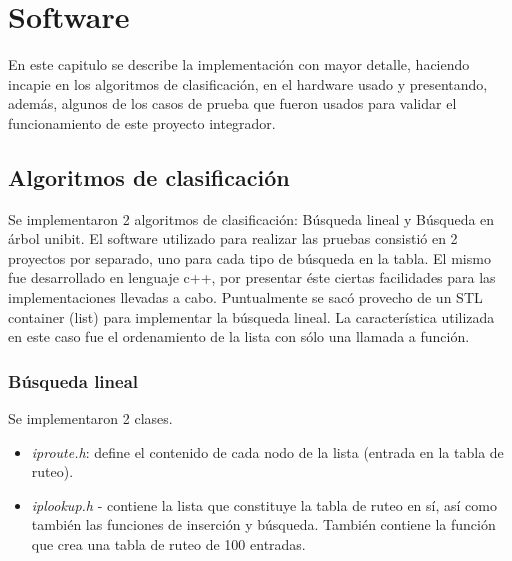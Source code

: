 \chapter{Software}

En este capitulo se describe la implementación con mayor detalle, haciendo incapie en los algoritmos de clasificación, en el hardware usado y presentando, además, algunos de los casos de prueba que fueron usados para validar el funcionamiento de este proyecto integrador.


\section{Algoritmos de clasificación}


Se implementaron 2 algoritmos de clasificación: Búsqueda lineal y Búsqueda en árbol unibit. El software utilizado para realizar las pruebas consistió en 2 proyectos por separado, uno para cada tipo de búsqueda en la tabla. El mismo fue desarrollado en lenguaje c++, por presentar éste ciertas facilidades para las implementaciones llevadas a cabo. Puntualmente se sacó provecho de un STL container (list) para implementar la búsqueda lineal. La característica utilizada en este caso fue el ordenamiento de la lista con sólo una llamada a función.

\subsection {Búsqueda lineal}

Se implementaron 2 clases. 

\begin{itemize}
	\item \textit{iproute.h}: define el contenido de cada nodo de la lista (entrada en la tabla de ruteo).
	\item \textit{iplookup.h} -  contiene la lista que constituye la tabla de ruteo en sí, así como también las funciones de inserción y búsqueda. También contiene la función que crea una tabla de ruteo de 100 entradas.
\end{itemize}

